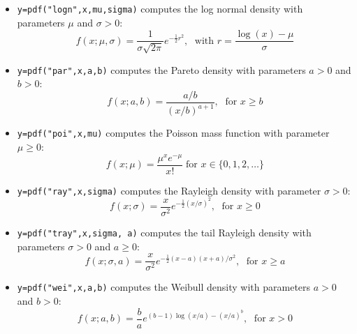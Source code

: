 \begin{mandescription}
\begin{itemize}
\item {} \verb!y=pdf("logn",x,mu,sigma)! computes
  the log normal density with parameters $\mu$ and $\sigma > 0$:
$$
     f(x; \mu, \sigma) = \frac{ 1 }{ \sigma \sqrt{2\pi}}
     e^{-\frac{1}{2} r^2 }, \; \mbox{ with } r = \frac{\log(x)-\mu}{\sigma}
$$


\item {} \verb!y=pdf("par",x,a,b)! computes the Pareto
  density with parameters $a > 0$ and $b > 0$:
$$
     f(x; a, b) = \frac{ a/b }{ (x/b)^{a+1} }, \; \mbox{ for } x \ge b
$$


\item {} \verb!y=pdf("poi",x,mu)! computes
  the Poisson mass function with parameter $\mu \ge 0$:
$$
     f(x; \mu) = \frac{\mu^x e^{-\mu}}{x!} \;\mbox{for } x \in \{0, 1, 2, \dots\}
$$

\item {} \verb!y=pdf("ray",x,sigma)! computes the Rayleigh
  density with parameter $\sigma > 0$:
$$
     f(x; \sigma) = \frac{x}{\sigma^2} e^{-\frac{1}{2} (x/\sigma)^2 }, \; \mbox{ for } x \ge 0
$$

\item {} \verb!y=pdf("tray",x,sigma, a)! computes
  the tail Rayleigh density with parameters $\sigma > 0$ and $a \ge 0$:
$$
     f(x; \sigma, a) = \frac{x}{\sigma^2} e^{-\frac{1}{2} (x-a)(x+a)/\sigma^2 }, \; \mbox{ for } x \ge a
$$


\item {} \verb!y=pdf("wei",x,a,b)! computes the Weibull
  density with parameters $a > 0$ and $b > 0$:
$$
     f(x; a, b) = \frac{b}{a} e^{ (b-1)\log(x/a) - (x/a)^b }, \; \mbox{ for } x > 0
$$

\end{itemize}

\end{mandescription}


